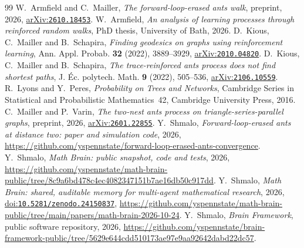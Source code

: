\documentclass[11pt]{amsart}
\theoremstyle{remark}
\newcommand{\doi}[1]{\href{https://doi.org/#1}{doi:\nolinkurl{#1}}}
\newcommand{\arxiv}[1]{\href{https://arxiv.org/abs/#1}{arXiv:\nolinkurl{#1}}}
\begin{document}
\begin{thebibliography}{99}
 W.~Armfield and C.~Mailler, \emph{The forward-loop-erased ants walk}, preprint, 2026,
\arxiv{2610.18453}.
 W.~Armfield, \emph{An analysis of learning processes through reinforced random walks}, PhD thesis,
University of Bath, 2026.
 D.~Kious, C.~Mailler and B.~Schapira, \emph{Finding geodesics on graphs using reinforcement learning},
Ann. Appl. Probab. \textbf{32} (2022), 3889--3929, \arxiv{2010.04820}.
 D.~Kious, C.~Mailler and B.~Schapira, \emph{The trace-reinforced ants process does not find shortest
paths}, J. \'Ec. polytech. Math. \textbf{9} (2022), 505--536, \arxiv{2106.10559}.
 R.~Lyons and Y.~Peres, \emph{Probability on Trees and Networks}, Cambridge Series in Statistical and
Probabilistic Mathematics~42, Cambridge University Press, 2016.
 C.~Mailler and P.~Varin, \emph{The two-nest ants process on triangle-series-parallel graphs}, preprint,
2026, \arxiv{2601.22855}.
 Y.~Shmalo, \emph{Forward-loop-erased ants at distance two: paper and simulation code}, 2026,
\url{https://github.com/yspennstate/forward-loop-erased-ants-convergence}.
 Y.~Shmalo, \emph{Math Brain: public snapshot, code and tests}, 2026,
\url{https://github.com/yspennstate/math-brain-public/tree/8c9a6bd478c4ec4082347151b7ae16db50c917dd}.
 Y.~Shmalo, \emph{Math Brain: shared, auditable memory for multi-agent mathematical research},
2026, \doi{10.5281/zenodo.24150837},
\url{https://github.com/yspennstate/math-brain-public/tree/main/papers/math-brain-2026-10-24}.
 Y.~Shmalo, \emph{Brain Framework}, public software repository, 2026,
\url{https://github.com/yspennstate/brain-framework-public/tree/5629e644cdd510173ae97e9aa92642dabd22dc57}.
\end{thebibliography}
\end{document}
